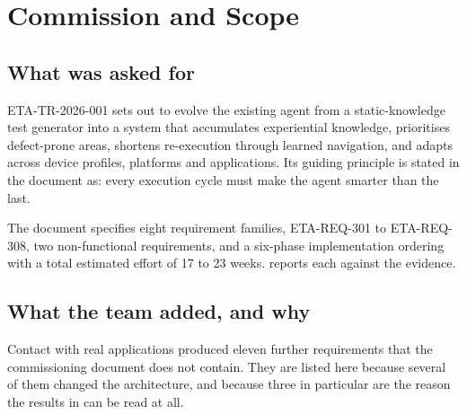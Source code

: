 \section{Commission and Scope}
\label{sec:commission}

\subsection{What was asked for}

ETA-TR-2026-001 sets out to evolve the existing agent from a static-knowledge
test generator into a system that accumulates experiential knowledge,
prioritises defect-prone areas, shortens re-execution through learned
navigation, and adapts across device profiles, platforms and applications. Its
guiding principle is stated in the document as: every execution cycle must make
the agent smarter than the last.

The document specifies eight requirement families, ETA-REQ-301 to ETA-REQ-308,
two non-functional requirements, and a six-phase implementation ordering with a
total estimated effort of 17 to 23 weeks.  reports each
against the evidence.

\subsection{What the team added, and why}

Contact with real applications produced eleven further requirements that the
commissioning document does not contain. They are listed here because several
of them changed the architecture, and because three in particular are the
reason the results in  can be read at all.

